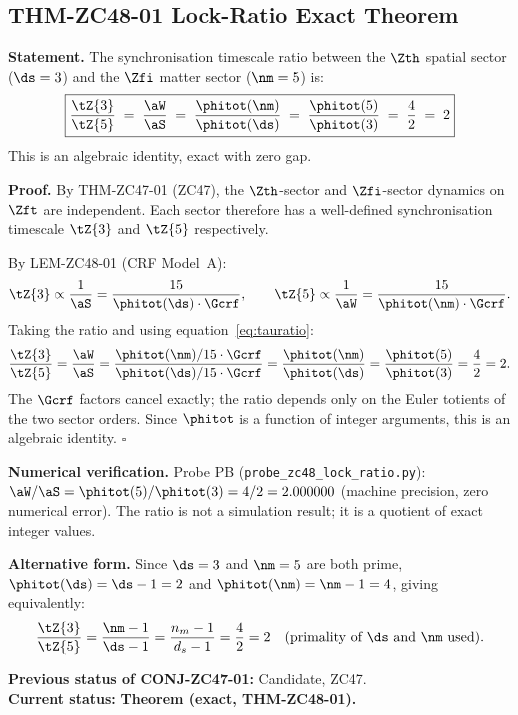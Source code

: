 \documentclass[12pt, a4paper]{article}
\begin{document}
\subsection{THM-ZC48-01 \quad Lock-Ratio Exact Theorem}
\label{sec:thm01}


\begin{formalbox}[title={THM-ZC48-01: Lock-Ratio Exact
  (Promotes CONJ-ZC47-01)}]
\textbf{Statement.}
The synchronisation timescale ratio between the $\Zth$ spatial
sector ($\ds = 3$) and the $\Zfi$ matter sector ($\nm = 5$)
is:
\begin{equation}
  \boxed{
  \frac{\tZ{3}}{\tZ{5}}
  \;=\;
  \frac{\aW}{\aS}
  \;=\;
  \frac{\phitot(\nm)}{\phitot(\ds)}
  \;=\;
  \frac{\phitot(5)}{\phitot(3)}
  \;=\;
  \frac{4}{2} \;=\; 2
  }
  \label{eq:lockratio-exact}
\end{equation}
This is an algebraic identity, exact with zero gap.

\textbf{Proof.}
By THM-ZC47-01 (ZC47), the $\Zth$-sector and $\Zfi$-sector
dynamics on $\Zft$ are independent.
Each sector therefore has a well-defined synchronisation
timescale $\tZ{3}$ and $\tZ{5}$ respectively.

By LEM-ZC48-01 (CRF Model~A):
\[
  \tZ{3} \propto \frac{1}{\aS}
  = \frac{15}{\phitot(\ds)\cdot\Gcrf},
  \qquad
  \tZ{5} \propto \frac{1}{\aW}
  = \frac{15}{\phitot(\nm)\cdot\Gcrf}.
\]
Taking the ratio and using equation~\eqref{eq:tauratio}:
\[
  \frac{\tZ{3}}{\tZ{5}}
  = \frac{\aW}{\aS}
  = \frac{\phitot(\nm)/15\cdot\Gcrf}{\phitot(\ds)/15\cdot\Gcrf}
  = \frac{\phitot(\nm)}{\phitot(\ds)}
  = \frac{\phitot(5)}{\phitot(3)}
  = \frac{4}{2} = 2.
\]
The $\Gcrf$ factors cancel exactly; the ratio depends only on
the Euler totients of the two sector orders.
Since $\phitot$ is a function of integer arguments, this is an
algebraic identity.
\hfill$\square$

\textbf{Numerical verification.}
Probe PB (\texttt{probe\_zc48\_lock\_ratio.py}):
$\aW/\aS = \phitot(5)/\phitot(3) = 4/2 = 2.000000$
(machine precision, zero numerical error).
The ratio is not a simulation result; it is a quotient of
exact integer values.

\textbf{Alternative form.}
Since $\ds = 3$ and $\nm = 5$ are both prime,
$\phitot(\ds) = \ds - 1 = 2$ and $\phitot(\nm) = \nm - 1 = 4$,
giving equivalently:
\[
  \frac{\tZ{3}}{\tZ{5}}
  = \frac{\nm - 1}{\ds - 1}
  = \frac{n_m - 1}{d_s - 1}
  = \frac{4}{2} = 2 \quad
  \text{(primality of $\ds$ and $\nm$ used).}
\]

\textbf{Previous status of CONJ-ZC47-01:}
Candidate, ZC47.\\
\textbf{Current status:}
\textbf{Theorem (exact, THM-ZC48-01).}
\end{formalbox}
\end{document}
